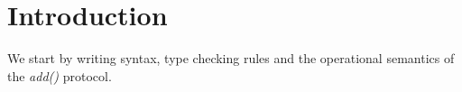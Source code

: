 
\section{Introduction}
We start by writing syntax, type checking rules and the operational semantics
of the \textit{add()} protocol. 
